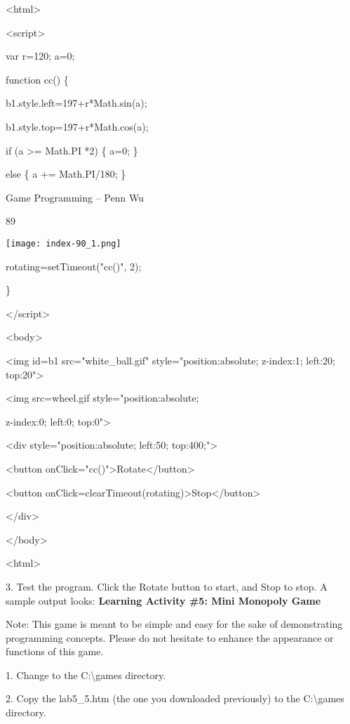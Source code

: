 \documentclass[
]{article}
\begin{document}
\textless html\textgreater{}

\textless script\textgreater{}

var r=120; a=0;

function cc() \{

b1.style.left=197+r*Math.sin(a);

b1.style.top=197+r*Math.cos(a);

if (a \textgreater= Math.PI *2) \{ a=0; \}

else \{ a += Math.PI/180; \}

Game Programming -- Penn Wu

89

\protect\hypertarget{index_split_006.htmlux5cux23p90}{}{}\texttt{[image: index-90\_1.png]}

rotating=setTimeout("cc()", 2);

\}

\textless/script\textgreater{}

\textless body\textgreater{}

\textless img id=b1 src="white\_ball.gif" style="position:absolute;
z-index:1; left:20; top:20"\textgreater{}

\textless img src=wheel.gif style="position:absolute;

z-index:0; left:0; top:0"\textgreater{}

\textless div style="position:absolute; left:50; top:400;"\textgreater{}

\textless button
onClick="cc()"\textgreater Rotate\textless/button\textgreater{}

\textless button
onClick=clearTimeout(rotating)\textgreater Stop\textless/button\textgreater{}

\textless/div\textgreater{}

\textless/body\textgreater{}

\textless html\textgreater{}

3. Test the program. Click the Rotate button to start, and Stop to stop.
A sample output looks: \textbf{Learning Activity \#5: Mini Monopoly
Game}

Note: This game is meant to be simple and easy for the sake of
demonstrating programming concepts. Please do not hesitate to enhance
the appearance or functions of this game.

1. Change to the C:\textbackslash games directory.

2. Copy the lab5\_5.htm (the one you downloaded previously) to the
C:\textbackslash games directory.
\end{document}
